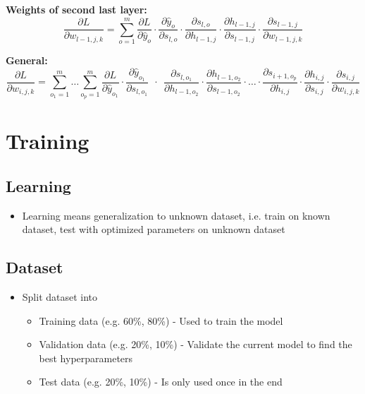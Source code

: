 \documentclass[10pt,a4paper]{article}
\begin{document}
\textbf{Weights of second last layer:}
$$
	\frac{\partial L}{\partial w_{l-1,j,k}} = \sum_{o = 1}^m \frac{\partial L}{\partial \hat y_o} ⋅ \frac{\partial \hat y_o}{\partial s_{l,o}} ⋅ \frac{\partial s_{l,o}}{\partial h_{l-1, j}} ⋅ \frac{\partial h_{l-1, j}}{\partial s_{l-1,j}} ⋅ \frac{\partial s_{l-1,j}}{\partial w_{l-1,j,k}}
$$

\textbf{General:}
$$
	\frac{\partial L}{\partial w_{i,j,k}} = \sum_{o_1 = 1}^m \dots \sum_{o_p = 1}^m \frac{\partial L}{\partial \hat y_{o_1}} ⋅ \frac{\partial \hat y_{o_1}}{\partial s_{l,o_1}} ~~⋅~~ \frac{\partial s_{l,o_1}}{\partial h_{l-1, o_2}} ⋅ \frac{\partial h_{l-1, o_2}}{\partial s_{l-1,o_2}} ⋅ \dots ⋅ \frac{\partial s_{i+1,o_p}}{\partial h_{i, j}} ⋅\frac{\partial h_{i, j}}{\partial s_{i,j}} ⋅ \frac{\partial s_{i,j}}{\partial w_{i,j,k}}
$$

\pagebreak

\section{Training}
\subsection{Learning}
\begin{itemize}
	\item Learning means generalization to unknown dataset, i.e. train on known dataset, test with optimized parameters on unknown dataset
\end{itemize}

\subsection{Dataset}
\begin{itemize}
	\item Split dataset into
	\begin{itemize}
		\item Training data (e.g. 60\%, 80\%) - Used to train the model
		\item Validation data (e.g. 20\%, 10\%) - Validate the current model to find the best hyperparameters
		\item Test data (e.g. 20\%, 10\%) - Is only used once in the end
	\end{itemize}
\end{itemize}
\end{document}
